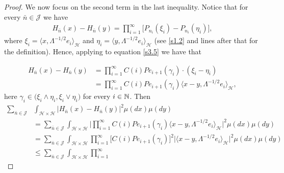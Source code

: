 \documentclass[review,onefignum,onetabnum]{siamart190516}
\begin{document}
\begin{proof}
We now focus on the second term in the last inequality. Notice that for every
$\bar n\in \mathcal{J}$ we have
\begin{align}\label{s3.5}
    H_{\bar n}(x) - H_{\bar n}(y) =
        \prod_{i = 1} ^ \infty
    \Big[
        P_{n_i}( \xi_i ) - P_{n_i} (\eta_i)
    \Big],
\end{align}
where $\xi_i= \langle x,\Lambda^{-1/2}e_i\rangle_{\mathcal{H}}$ and $\eta_i=
\langle y,\Lambda^{-1/2}e_i\rangle_{\mathcal{H}}$
(see \eqref{s1.2} and lines after that for the definition).
Hence, applying  to equation \eqref{s3.5} we have that

\begin{equation}
\label{s3.6}
\begin{aligned}
    H_{\bar n}(x)-H_{\bar n}(y)&=\prod_{i=1}^\infty C(i)Pe_{i+1}(\gamma_i)
    \cdot
    (\xi_i-\eta_i)
    \\
    &=
    \prod_{i=1}^\infty
    C(i)Pe_{i+1}(\gamma_i)
    \langle
        x-y, \Lambda^{-1/2}e_i
    \rangle_{\mathcal{H}},
 \end{aligned}
\end{equation}
here $\gamma_i\in \big(\xi_i\wedge\eta_i, \xi_i\vee \eta_i  \big)$
for every $i\in {\mathbb N}$.
Then
\begin{equation}
    \label{s3.8}
    \begin{aligned}
        \sum_{\bar n\in \mathcal{J}}
        &
        \int_{\mathcal{H}\times \mathcal{H}}
            \big|
                H_{\bar n}(x) -H_{\bar n}(y)
            \big|^2
        \mu(dx)\mu(dy)
        \\
        &=
        \sum_{\bar n\in \mathcal{J}}
            \int_{\mathcal{H}\times \mathcal{H}}
                \Big|
                    \prod_{i=1}^\infty C(i)Pe_{i+1}(\gamma_i)
                    \langle
                        x-y,
                        \Lambda^{-1/2}e_i
                    \rangle_{\mathcal{H}}
                \Big|^2
        \mu(dx)\mu(dy)
        \\
        &=
        \sum_{\bar n\in \mathcal{J}}
        \int_{\mathcal{H}\times \mathcal{H}}
            \prod_{i=1}^\infty
            \Big[
                C(i) Pe_{i+1}(\gamma_i)\Big]^2
            \Big|
                \langle
                    x-y,\Lambda^{-1/2}e_i
                \rangle_{\mathcal{H}}
            \Big|^2
            \mu(dx) \mu(dy)
        \\
        &\le
            \sum_{\bar n\in \mathcal{J}}
            \int_{\mathcal{H} \times \mathcal{H}}
                \prod_{i=1}^\infty

\end{aligned}
\end{equation}
\end{proof}
\end{document}
